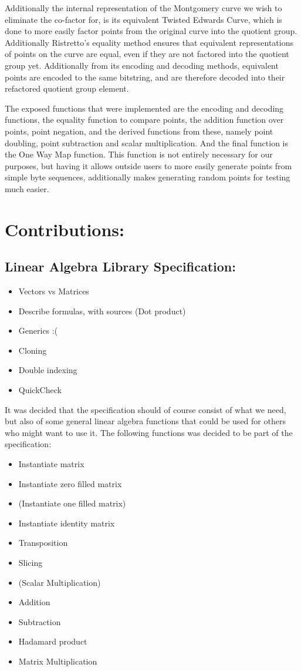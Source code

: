 \documentclass{article}
\begin{document}
Additionally the internal representation of the Montgomery curve we wish
to eliminate the co-factor for, is its equivalent Twisted Edwards Curve,
which is done to more easily factor points from the original curve into
the quotient group. Additionally Ristretto's equality method ensures
that equivalent representations of points on the curve are equal, even
if they are not factored into the quotient group yet. Additionally
from its encoding and decoding methods, equivalent points are encoded
to the same bitstring, and are therefore decoded into their refactored
quotient group element.

The exposed functions that were implemented are the encoding and decoding
functions, the equality function to compare points, the addition function
over points, point negation, and the derived functions from these,
namely point doubling, point subtraction and scalar multiplication. And
the final function is the One Way Map function. This function is not
entirely necessary for our purposes, but having it allows outside users
to more easily generate points from simple byte sequences, additionally
makes generating random points for testing much easier.

\section{Contributions:}

\subsection{Linear Algebra Library Specification:}
\begin{itemize}
	\item Vectors vs Matrices 
	\item Describe formulas, with sources (Dot product) 
	\item Generics :(
	\item Cloning
	\item Double indexing
	\item QuickCheck
\end{itemize} 

It was decided that the specification should of course consist of what we
need, but also of some general linear algebra functions that could be
used for others who might want to use it. The following functions was
decided to be part of the specification:

\begin{itemize}
	\item Instantiate matrix
	\item Instantiate zero filled matrix
	\item (Instantiate one filled matrix)
	\item Instantiate identity matrix
	\item Transposition
	\item Slicing
	\item (Scalar Multiplication)
	\item Addition
	\item Subtraction
	\item Hadamard product
	\item Matrix Multiplication
\end{itemize}
\end{document}
